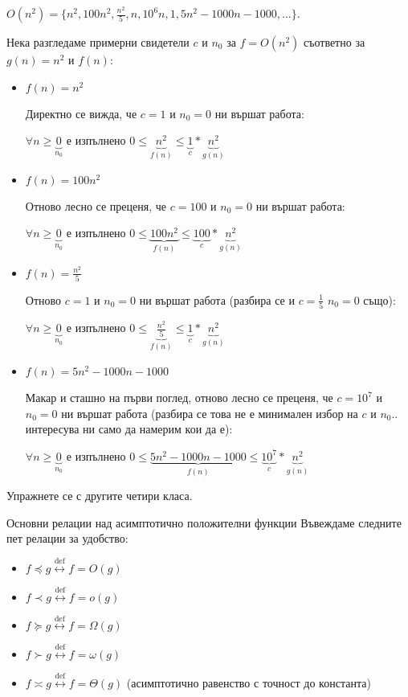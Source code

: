\begin{example}
	$O(n^2)=\{n^2,100n^2,\frac{n^2}5,n,{10}^6n,1,5n^2-1000n-1000,\dots\}$.

	\noindent
	Нека разгледаме примерни свидетели $c$ и $n_0$ за $f=O(n^2)$ съответно за $g(n)=n^2$ и $f(n)$:
	\begin{itemize}
		\item $f(n)=n^2$
		
		Директно се вижда, че $c=1$ и $n_0=0$ ни вършат работа:
		
		$\forall n\ge\underbrace0_{n_0}$ е изпълнено $0\le \underbrace{n^2}_{f(n)}\le\underbrace1_c*\underbrace{n^2}_{g(n)}$
		\item $f(n)=100n^2$
		
		Отново лесно се преценя, че $c=100$ и $n_0=0$ ни вършат работа:
		
		$\forall n\ge\underbrace0_{n_0}$ е изпълнено $0\le \underbrace{100n^2}_{f(n)}\le\underbrace{100}_c*\underbrace{n^2}_{g(n)}$
		
		\item $f(n)=\frac{n^2}5$
		
		Отново $c=1$ и $n_0=0$ ни вършат работа (разбира се и $c=\frac15$ $n_0=0$ също):
		
		$\forall n\ge\underbrace0_{n_0}$ е изпълнено $0\le \underbrace{\frac{n^2}5}_{f(n)}\le\underbrace1_c*\underbrace{n^2}_{g(n)}$
		
		\item $f(n)=5n^2-1000n-1000$
		
		Макар и сташно на първи поглед, отново лесно се преценя, че $c={10}^7$ и $n_0=0$ ни вършат работа (разбира се това не е минимален избор на $c$ и $n_0$.. интересува ни само да намерим кои да е):
		
		$\forall n\ge\underbrace0_{n_0}$ е изпълнено $0\le \underbrace{5n^2-1000n-1000}_{f(n)}\le\underbrace{{10}^7}_c*\underbrace{n^2}_{g(n)}$
	\end{itemize}
\end{example}

\noindent
Упражнете се с другите четири класа.

\begin{boxnotation}{Основни релации над асимптотично положителни функции}{}
	Въвеждаме следните пет релации за удобство:
	\begin{itemize}
		\item $f\preccurlyeq g\overset{\text{def}}\leftrightarrow f=O(g)$
		\item $f\prec g\overset{\text{def}}\leftrightarrow f=o(g)$
		\item $f\succcurlyeq g\overset{\text{def}}\leftrightarrow f=\Omega(g)$
		\item $f\succ g\overset{\text{def}}\leftrightarrow f=\omega(g)$
		\item $f\asymp g\overset{\text{def}}\leftrightarrow f=\Theta(g)$ (асимптотично равенство с точност до константа)
	\end{itemize}
\end{boxnotation}

